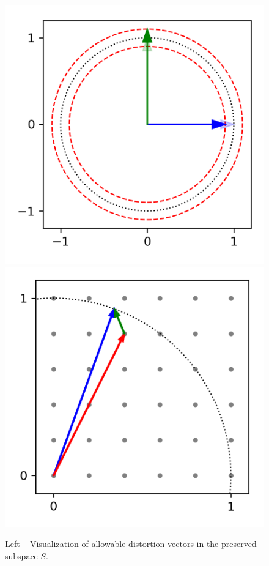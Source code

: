 \begin{figure}
    \centering
    \includegraphics{figures/unit_sphere.png}
    \includegraphics{figures/epsilon_net.png}
    \caption{Left – Visualization of allowable distortion vectors in the preserved subspace $S$. 
}
\end{figure}
